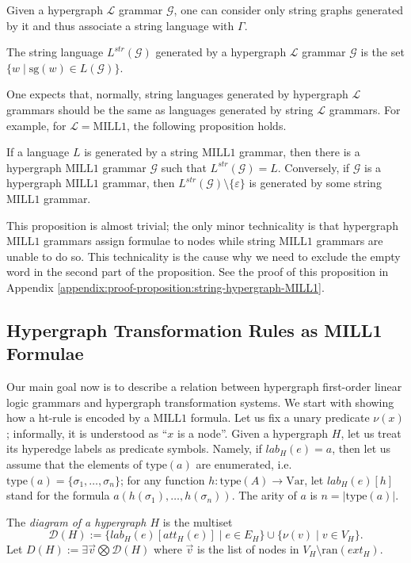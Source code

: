 \documentclass[a4paper,UKenglish,cleveref, autoref, thm-restate,pdfa]{lipics-v2021}
\newcommand{\eqdef}{:=}
\newcommand{\ran}{\mathrm{ran}}
\newcommand{\Gram}{\mathcal{G}}
\newcommand{\lab}{\mathit{lab}}
\newcommand{\att}{\mathit{att}}
\newcommand{\ext}{\mathit{ext}}
\newcommand{\type}{\mathrm{type}}
\newcommand{\SG}{\mathrm{sg}}
\newcommand{\str}{{\mathit{str}}}
\newcommand{\Var}{\mathrm{Var}}
\newcommand{\Logic}{\mathcal{L}}
\newcommand{\MILLFO}{\mathrm{MILL}1}
\newcommand{\diag}{\mathcal{D}}
\begin{document}
Given a hypergraph $\Logic$ grammar $\Gram$, one can consider only string graphs generated by it and thus associate a string language with $\Gamma$.
\begin{definition}
	The string language $L^\str(\Gram)$ generated by a hypergraph $\Logic$ grammar $\Gram$ is the set $\{w \mid \SG(w) \in L(\Gram)\}$.
\end{definition}
One expects that, normally, string languages generated by hypergraph $\Logic$ grammars should be the same as languages generated by string $\Logic$ grammars. For example, for $\Logic=\MILLFO$, the following proposition holds.
\begin{proposition}\label{proposition:string-hypergraph-MILL1}
	If a language $L$ is generated by a string $\MILLFO$ grammar, then there is a hypergraph $\MILLFO$ grammar $\Gram$ such that $L^{\str}(\Gram)=L$. Conversely, if $\Gram$ is a hypergraph $\MILLFO$ grammar, then $L^{\str}(\Gram) \setminus \{\varepsilon\}$ is generated by some string $\MILLFO$ grammar.
\end{proposition}
This proposition is almost trivial; the only minor technicality is that hypergraph $\MILLFO$ grammars assign formulae to nodes while string $\MILLFO$ grammars are unable to do so. This technicality is the cause why we need to exclude the empty word in the second part of the proposition. See the proof of this proposition in Appendix \ref{appendix:proof-proposition:string-hypergraph-MILL1}.

\subsection{Hypergraph Transformation Rules as MILL1 Formulae}

Our main goal now is to describe a relation between hypergraph first-order linear logic grammars and hypergraph transformation systems. We start with showing how a ht-rule is encoded by a $\MILLFO$ formula. Let us fix a unary predicate $\nu(x)$; informally, it is understood as ``$x$ is a node''. Given a hypergraph $H$, let us treat its hyperedge labels as predicate symbols. Namely, if $\lab_H(e)=a$, then let us assume that the elements of $\type(a)$ are enumerated, i.e. $\type(a) = \{\sigma_1,\ldots,\sigma_n\}$; for any function $h:\type(A) \to \Var$, let $\lab_H(e)[h]$ stand for the formula $a(h(\sigma_1),\ldots,h(\sigma_n))$. The arity of $a$ is $n=\vert\type(a)\vert$. 
\begin{definition}\label{definition:diagram}
	The \emph{diagram of a hypergraph $H$} is the multiset $$\diag(H) \eqdef \{\lab_H(e)[\att_H(e)] \mid e \in E_H \} \cup \{ \nu(v) \mid v \in V_H \}.$$
	Let $D(H) \eqdef \exists \vec{v} \bigotimes \mathcal{D}(H)$ where $\vec{v}$ is the list of nodes in $V_H \setminus \ran(\ext_H)$.
\end{definition}
\end{document}
